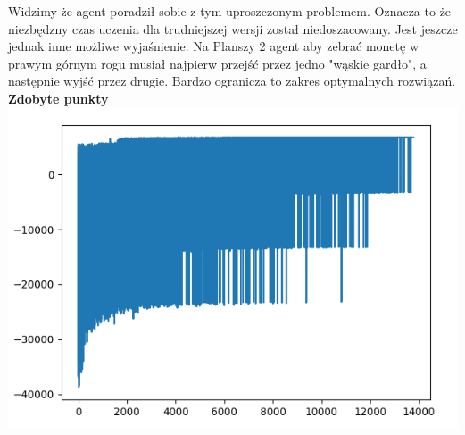 \documentclass[a4paper,12pt]{article}
\begin{document}
Widzimy że agent poradził sobie z tym uproszczonym problemem. Oznacza to że niezbędzny czas uczenia dla trudniejszej wersji został niedoszacowany. Jest jeszcze jednak inne możliwe wyjaśnienie. Na Planszy 2 agent aby zebrać monetę w prawym górnym rogu musiał najpierw przejść przez jedno "wąskie gardło", a następnie wyjść przez drugie. Bardzo ogranicza to zakres optymalnych rozwiązań.  \newline \newline
\textbf{\Large{Zdobyte punkty}} \newline
\includegraphics[scale=0.9]{testy/wykres3.png}
\newline \newline
\end{document}
